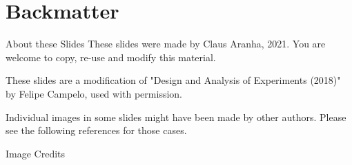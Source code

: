 \section{Backmatter}
\begin{frame}{About these Slides}
  These slides were made by Claus Aranha, 2021. You are welcome to copy, re-use and modify this material.
  \bigskip

  These slides are a modification of "Design and Analysis of Experiments (2018)" by Felipe Campelo, used with permission.
  \bigskip

  Individual images in some slides might have been made by other
  authors. Please see the following references for those cases.
\end{frame}

\begin{frame}[allowframebreaks]{Image Credits}
  \printnotes
\end{frame}
